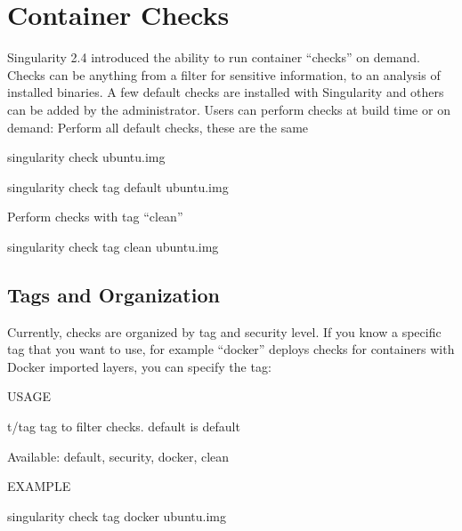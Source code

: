 \documentclass[letterpaper,10pt,english]{sphinxmanual}
\begin{document}
\chapter{Container Checks}
\label{\detokenize{container_checks:container-checks}}\label{\detokenize{container_checks::doc}}
Singularity 2.4 introduced the ability to run container “checks” on
demand. Checks can be anything from a filter for sensitive
information, to an analysis of installed binaries. A few default checks are installed with Singularity and others can be added by the
administrator. Users can perform checks at build time or on demand:
Perform all default checks, these are the same

%
\begin{sphinxVerbatim}[commandchars=\\\{\}]
\PYGZdl{} singularity check ubuntu.img

\PYGZdl{} singularity check \PYGZhy{}\PYGZhy{}tag default ubuntu.img
\end{sphinxVerbatim}

Perform checks with tag “clean”

%
\begin{sphinxVerbatim}[commandchars=\\\{\}]
\PYGZdl{} singularity check \PYGZhy{}\PYGZhy{}tag clean ubuntu.img
\end{sphinxVerbatim}


\section{Tags and Organization}
\label{\detokenize{container_checks:tags-and-organization}}
Currently, checks are organized by tag and security level. If you know a
specific tag that you want to use, for example “docker” deploys checks
for containers with Docker imported layers, you can specify the tag:

%
\begin{sphinxVerbatim}[commandchars=\\\{\}]
USAGE

    \PYGZhy{}t/\PYGZhy{}\PYGZhy{}tag       tag to filter checks. default is \PYGZdq{}default\PYGZdq{}

                      Available: default, security, docker, clean


EXAMPLE

\PYGZdl{} singularity check \PYGZhy{}\PYGZhy{}tag docker ubuntu.img
\end{sphinxVerbatim}
\end{document}

